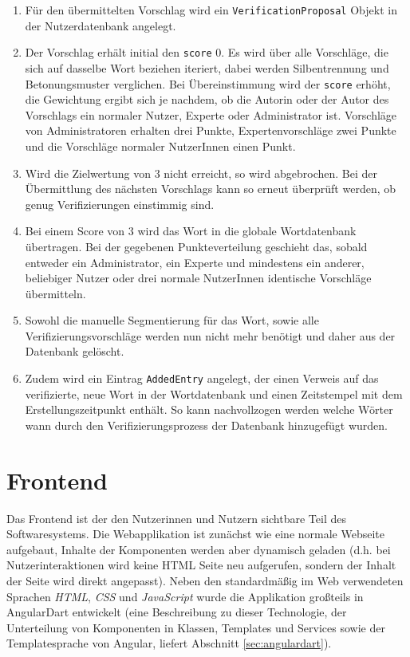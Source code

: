 \begin{enumerate}
	\item Für den übermittelten Vorschlag wird ein \texttt{VerificationProposal} Objekt in der Nutzerdatenbank angelegt.
	
	\item Der Vorschlag erhält initial den \texttt{score} $0$. Es wird über alle Vorschläge, die sich auf dasselbe Wort beziehen iteriert, dabei werden Silbentrennung und Betonungsmuster verglichen. Bei Übereinstimmung wird der \texttt{score} erhöht, die Gewichtung ergibt sich je nachdem, ob die Autorin oder der Autor des Vorschlags ein normaler Nutzer, Experte oder Administrator ist. Vorschläge von Administratoren erhalten drei Punkte, Expertenvorschläge zwei Punkte und die Vorschläge normaler NutzerInnen einen Punkt.
	
	\item Wird die Zielwertung von $3$ nicht erreicht, so wird abgebrochen. Bei der Übermittlung des nächsten Vorschlags kann so erneut überprüft werden, ob genug Verifizierungen einstimmig sind.
	
	\item Bei einem Score von $3$ wird das Wort in die globale Wortdatenbank übertragen. Bei der gegebenen Punkteverteilung geschieht das, sobald entweder ein Administrator, ein Experte und mindestens ein anderer, beliebiger Nutzer oder drei normale NutzerInnen identische Vorschläge übermitteln.
	
	\item Sowohl die manuelle Segmentierung für das Wort, sowie alle Verifizierungsvorschläge werden nun nicht mehr benötigt und daher aus der Datenbank gelöscht.
	
	\item Zudem wird ein Eintrag \texttt{AddedEntry} angelegt, der einen Verweis auf das verifizierte, neue Wort in der Wortdatenbank und einen Zeitstempel mit dem Erstellungszeitpunkt enthält. So kann nachvollzogen werden welche Wörter wann durch den Verifizierungsprozess der Datenbank hinzugefügt wurden.
\end{enumerate}









\section{Frontend}

Das Frontend ist der den Nutzerinnen und Nutzern sichtbare Teil des Softwaresystems. Die Webapplikation ist zunächst wie eine normale Webseite aufgebaut, Inhalte der Komponenten werden aber dynamisch geladen (d.h. bei Nutzerinteraktionen wird keine HTML Seite neu aufgerufen, sondern der Inhalt der Seite wird direkt angepasst). Neben den standardmäßig im Web verwendeten Sprachen \textit{HTML}, \textit{CSS} und \textit{JavaScript} wurde die Applikation großteils in AngularDart entwickelt (eine Beschreibung zu dieser Technologie, der Unterteilung von Komponenten in Klassen, Templates und Services sowie der Templatesprache von Angular, liefert Abschnitt \ref{sec:angulardart}).\\

